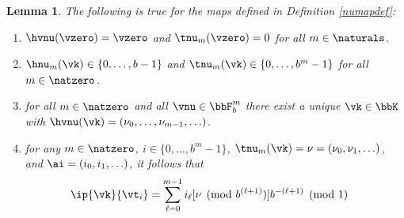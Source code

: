 \documentclass[]{elsarticle}
\newtheorem{lem}{Lemma}
\theoremstyle{definition}
\begin{document}
\begin{lem} \label{numaplem} The following is true for the maps defined in Definition \ref{numapdef}:
\begin{enumerate}
\renewcommand{\labelenumi}{\alph{enumi})}

\item $\hvnu(\vzero)=\vzero$ and $\tnu_m(\vzero) = 0$ for all $m \in \naturals$.

\item $\hnu_m(\vk)\in \{0,\dots,b-1\}$ and $\tnu_m(\vk)\in \{0,\dots,b^m-1\}$ for all $m\in\natzero$.

\item for all $m\in \natzero$ and all $\vnu \in \bbF_b^{m}$ there exist a unique $\vk \in \bbK$ with $\hvnu(\vk)=(\nu_0, \ldots, \nu_{m-1}, \ldots)$.

\item for any $m \in \natzero$, $i \in \{0, \ldots, b^m-1\}$,  $\tnu_m(\vk)=\nu=(\nu_0, \nu_1, \ldots)$, and $\ai=(i_0, i_1, \ldots)$, it follows that
\begin{align} \label{nuwisum}
\begin{split}
\ip{\vk}{\vt_i} &= \sum_{\ell=0}^{m-1} i_\ell [\nu \pmod  {b^{(\ell+1)}}]  b^{-(\ell+1)} \pmod 1
\end{split}
\end{align}

\end{enumerate}
\end{lem}
\end{document}
